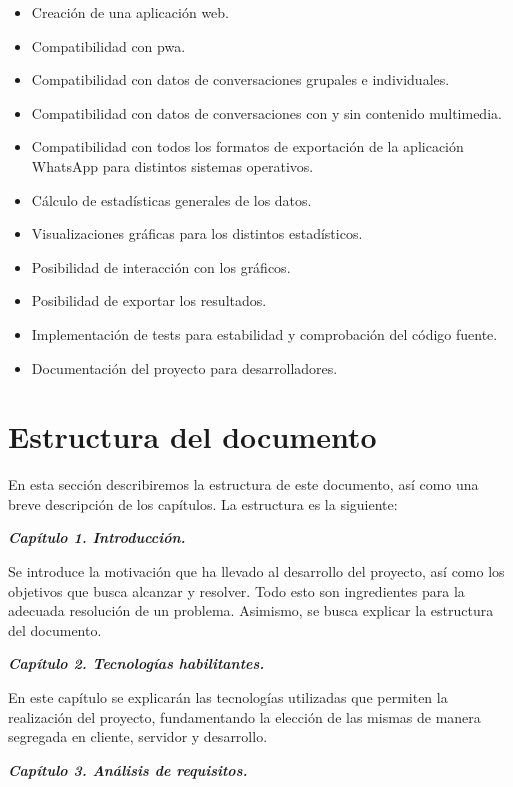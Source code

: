 \begin{itemize}


\item Creación de una aplicación web.
\item Compatibilidad con \acrfull{pwa}.
\item Compatibilidad con datos de conversaciones grupales e individuales.
\item Compatibilidad con datos de conversaciones con y sin contenido multimedia.
\item Compatibilidad con todos los formatos de exportación de la aplicación WhatsApp para distintos sistemas operativos.
\item Cálculo de estadísticas generales de los datos.
\item Visualizaciones gráficas para los distintos estadísticos.
\item Posibilidad de interacción con los gráficos.
\item Posibilidad de exportar los resultados.
\item Implementación de tests para estabilidad y comprobación del código fuente.
\item Documentación del proyecto para desarrolladores.

\end{itemize}

\section{Estructura del documento}
\label{sec:structure-of-document}

En esta sección describiremos la estructura de este documento, así como una breve descripción de los capítulos. La estructura es la siguiente:

\textbf{\textit{Capítulo 1. Introducción.}}

Se introduce la motivación que ha llevado al desarrollo del proyecto, así como los objetivos que busca alcanzar y resolver. Todo esto son ingredientes para la adecuada resolución de un problema. Asimismo, se busca explicar la estructura del documento.

\textbf{\textit{Capítulo 2. Tecnologías habilitantes.}}

En este capítulo se explicarán las tecnologías utilizadas que permiten la realización del proyecto, fundamentando la elección de las mismas de manera segregada en cliente, servidor y desarrollo.

\textbf{\textit{Capítulo 3. Análisis de requisitos.}}

